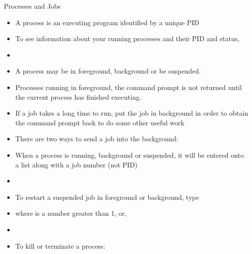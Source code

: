 \documentclass[10pt,t]{beamer}
\begin{document}
\begin{frame}{Processes and Jobs}
  \begin{itemize}
    \item A process is an executing program identified by a unique PID
    \item[$\mybigstar$] To see information about your running processes and their PID and status,
    \item[] 
    \item A process may be in foreground, background or be suspended.
    \item Processes running in foreground, the command prompt is not returned until the current process has finished executing.
    \item If a job takes a long time to run, put the job in background in order to obtain the command prompt back to do some other useful work
    \item There are two ways to send a job into the background:
    \framebreak
    \item When a process is running, background or suspended, it will be entered onto a list along with a job number (not PID)
    \item[] 
    \item To restart a suspended job in foreground or background, type
    \item[]  where  is a number greater than 1, or,
    \item[]  
    \item To kill or terminate a process:
\end{itemize}
\end{frame}
\end{document}
